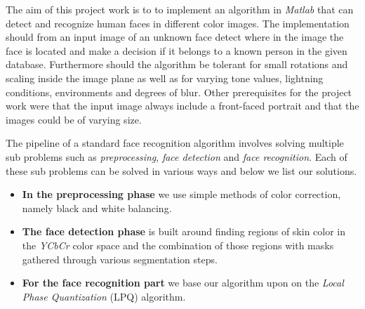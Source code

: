 The aim of this project work is to to implement an algorithm in \textit{Matlab} that can detect and recognize human faces in different color images. The implementation should from an input image of an unknown face detect where in the image the face is located and make a decision if it belongs to a known person in the given database. Furthermore should the algorithm be tolerant for small rotations and scaling inside the image plane as well as for varying tone values, lightning conditions, environments and degrees of blur. Other prerequisites for the project work were that the input image always include a front-faced portrait and that the images could be of varying size.

The pipeline of a standard face recognition algorithm involves solving multiple sub problems such as \textit{preprocessing}, \textit{face detection} and \textit{face recognition}. Each of these sub problems can be solved in various ways and below we list our solutions.

\begin{itemize}
  \item \textbf{In the preprocessing phase} we use simple methods of color correction, namely black and white balancing. 
  \item \textbf{The face detection phase} is built around finding regions of skin color in the \textit{YCbCr} color space and the combination of those regions with masks gathered through various segmentation steps. 
  \item \textbf{For the face recognition part} we base our algorithm upon on the \textit{Local Phase Quantization} (LPQ) algorithm. 

\end{itemize}
